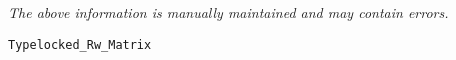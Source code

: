 \label{pkg:rw\_matrix\_of\_eight\_byte\_floats}

{\tiny \it The above information is manually maintained and may contain errors.}
\begin{verbatim}
Typelocked_Rw_Matrix
\end{verbatim}
